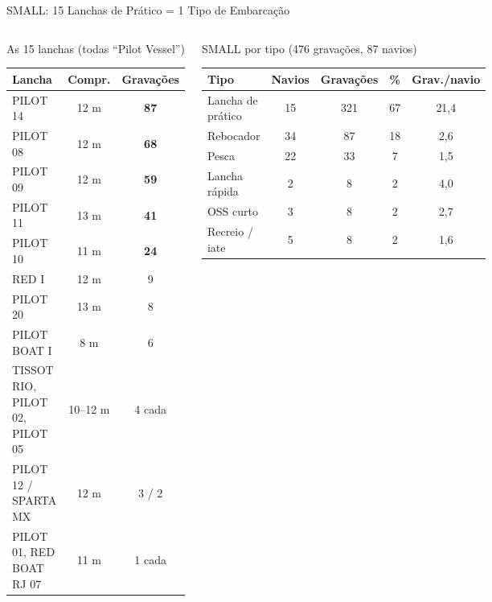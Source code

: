 \documentclass[aspectratio=169]{beamer}
\newcommand{\calo}[1]{\cellcolor{red!20}#1}
\begin{document}
\begin{frame}{SMALL: 15 Lanchas de Prático = 1 Tipo de Embarcação}
    \footnotesize
    \begin{columns}[t]
        \begin{block}{\small As 15 lanchas (todas ``Pilot Vessel'')}
            \tiny
            \centering
            \setlength{\tabcolsep}{3pt}
            \begin{tabular}{lcc}
            \toprule
            Lancha & Compr. & Gravações \\
            \midrule
            PILOT 14 & 12 m & \textbf{87} \\
            PILOT 08 & 12 m & \textbf{68} \\
            PILOT 09 & 12 m & \textbf{59} \\
            PILOT 11 & 13 m & \textbf{41} \\
            PILOT 10 & 11 m & \textbf{24} \\
            RED I & 12 m & 9 \\
            PILOT 20 & 13 m & 8 \\
            PILOT BOAT I & 8 m & 6 \\
            TISSOT RIO, PILOT 02, PILOT 05 & 10--12 m & 4 cada \\
            PILOT 12 / SPARTA MX & 12 m & 3 / 2 \\
            PILOT 01, RED BOAT RJ 07 & 11 m & 1 cada \\
            \bottomrule
            \end{tabular}
        \end{block}
        \begin{block}{\small SMALL por tipo (476 gravações, 87 navios)}
            \tiny
            \centering
            \setlength{\tabcolsep}{3pt}
            \begin{tabular}{lcccc}
            \toprule
            Tipo & Navios & Gravações & \% & Grav./navio \\
            \midrule
            Lancha de prático & 15 & 321 & \calo{67} & \calo{21,4} \\
            Rebocador & 34 & 87 & 18 & 2,6 \\
            Pesca & 22 & 33 & 7 & 1,5 \\
            Lancha rápida & 2 & 8 & 2 & 4,0 \\
            OSS curto & 3 & 8 & 2 & 2,7 \\
            Recreio / iate & 5 & 8 & 2 & 1,6 \\

\end{tabular}
\end{block}
\end{columns}
\end{frame}
\end{document}
